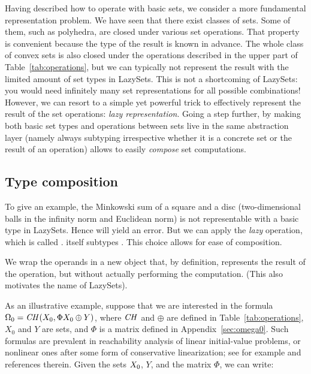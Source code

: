 Having described how to operate with basic sets, we consider a more fundamental representation problem.
%
We have seen that there exist classes of sets.
Some of them, such as polyhedra, are closed under various set operations. That property is convenient because the type of the result is known in advance.
%
The whole class of convex sets is also closed under the operations described in the upper part of Table~\ref{tab:operations}, but we can typically not represent the result with the limited amount of set types in LazySets. This is not a shortcoming of LazySets: you would need infinitely many set representations for all possible combinations! However, we can resort to a simple yet powerful trick to effectively represent the result of the set operations: \emph{lazy representation}.
%
Going a step further, by making both basic set types and operations between sets live in the same abstraction layer (namely always subtyping  irrespective whether it is a concrete set or the result of an operation) allows to easily \emph{compose} set computations.


\subsection{Type composition} \label{sec:composition}

To give an example, the Minkowski sum of a square and a disc (two-dimensional balls in the infinity norm and Euclidean norm) is not representable with a basic type in LazySets. Hence  will yield an error. But we can apply the \emph{lazy} operation, which is called .  itself subtypes . This choice allows for ease of composition.

We wrap the operands in a new object that, by definition, represents the result of the operation, but without actually performing the computation. (This also motivates the name of LazySets).

\smallskip

As an illustrative example, suppose that we are interested in the formula $\Omega_0 = \mathit{CH}(X_0, \Phi X_0 \oplus Y)$, where $\mathit{CH}$ and $\oplus$ are defined in Table~\ref{tab:operations}, $X_0$ and $Y$ are sets, and $\Phi$ is a matrix defined in Appendix~\ref{sec:omega0}. Such formulas are prevalent in reachability analysis of linear initial-value problems, or nonlinear ones after some form of conservative linearization; see for example \cite{althoff2020set} and references therein. Given the sets $X_0$, $Y$, and the matrix $\Phi$, we can write:

